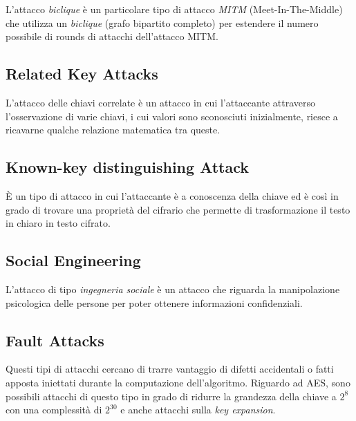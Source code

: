      

\textsf{\small L'attacco \emph{biclique} è un particolare tipo di attacco \emph{MITM} (Meet-In-The-Middle) che utilizza un \emph{biclique} (grafo bipartito completo) per estendere il numero possibile di rounds di attacchi dell'attacco MITM.}

\subsection{Related Key Attacks}

  

\textsf{\small L'attacco delle chiavi correlate è un attacco in cui l'attaccante attraverso l'osservazione di varie chiavi, i cui valori sono sconosciuti inizialmente, riesce a ricavarne qualche relazione matematica tra queste.} %

\subsection{Known-key distinguishing Attack}

  

\textsf{\small È un tipo di attacco in cui l'attaccante è a conoscenza della chiave ed è così in grado di trovare una proprietà del cifrario che permette di trasformazione il testo in chiaro in testo cifrato.}

\subsection{Social Engineering}

 

\textsf{\small L'attacco di tipo \emph{ingegneria sociale} è un attacco che riguarda la manipolazione psicologica delle persone per poter ottenere informazioni confidenziali.}

\subsection{Fault Attacks}

   

\textsf{\small Questi tipi di attacchi cercano di trarre vantaggio di difetti accidentali o fatti apposta iniettati durante la computazione dell'algoritmo. Riguardo ad AES, sono possibili attacchi di questo tipo in grado di ridurre la grandezza della chiave a $2^8$ con una complessità di $2^{30}$ e anche attacchi sulla \emph{key expansion}.}

